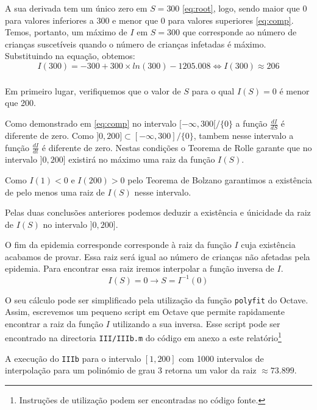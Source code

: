 \documentclass[portuguese, a4paper]{article}
\newcommand\tu[0]{\textunderscore}
\begin{document}
		A sua derivada tem um único zero em $S =
		300$ \eqref{eq:root}, logo, sendo maior que 0 para valores inferiores a 300 e menor que
		0 para valores superiores \eqref{eq:comp}.
		Temos, portanto, um máximo de $I$ em $S = 300$ que corresponde ao número de
		crianças suscetíveis quando o número de crianças infetadas é máximo.
		Substituindo na equação, obtemos:
		\begin{equation}
		I(300) = -300 + 300 \times ln(300) - 1205.008 \Leftrightarrow I(300) \approx 206
		\end{equation}

		\subsubsection{}
		Em primeiro lugar, verifiquemos que o valor de $S$ para o qual $I(S) = 0$ é menor que 200.
		\par
		Como demonstrado em \eqref{eq:comp} no intervalo $[-\infty, 300[/\{0\}$ a
		função $\frac{dI}{dS}$ é diferente de zero. Como $]0, 200] \subset
		[-\infty, 300]/\{0\}$, tambem nesse intervalo a função $\frac{dI}{dt}$
		é diferente de zero. Nestas condições o Teorema de Rolle garante que no
		intervalo $]0, 200]$ existirá no máximo uma raiz da função $I(S)$.
		\par
		Como $I(1) < 0$ e $I(200) > 0$ pelo Teorema de Bolzano garantimos a
		existência de pelo menos uma raiz de $I(S)$ nesse intervalo.
		\par
		Pelas duas conclusões anteriores podemos deduzir a existência e
		únicidade da raiz de $I(S)$ no intervalo $]0, 200]$.

		\vspace{5mm}
		\par
		O fim da epidemia corresponde corresponde à raiz da função $I$ cuja
		existência acabamos de provar. Essa raiz será igual ao número de
		crianças não afetadas pela epidemia.
		Para encontrar essa raiz iremos	interpolar a função inversa de $I$. \\
		\begin{equation} 
			I(S) = 0 \rightarrow S = I^{-1}(0)
		\end{equation}
		\par O seu cálculo pode ser simplificado
		pela utilização da função \texttt{polyfit} do Octave.
		Assim, escrevemos um pequeno script em Octave que permite rapidamente
		encontrar a raiz da função $I$ utilizando a sua inversa. Esse script
		pode ser encontrado na directoria \texttt{III/III\tu b.m} do código em
		anexo a este relatório\footnote{Instruções de utilização podem ser
		encontradas no código fonte.}
		\par
		A execução do \texttt{III\tu b} para o intervalo $[1, 200]$ com 1000
		intervalos de interpolação para um polinómio de grau 3 retorna um valor
		da raiz $\approx 73.899$.
\end{document}
